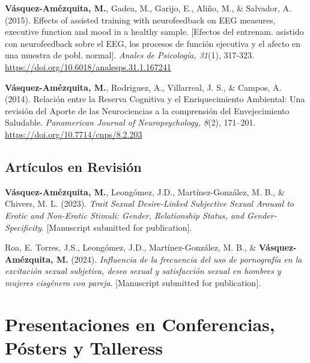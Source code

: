 \documentclass[11pt,a4paper,]{awesome-cv}
\begin{document}
\textbf{Vásquez-Amézquita, M.}, Gadea, M., Garijo, E., Aliño, M., \&
Salvador, A. (2015). Effects of assisted training with neurofeedback on
EEG measures, executive function and mood in a healthy sample.
{[}Efectos del entrenam. asistido con neurofeedback sobre el EEG, los
procesos de función ejecutiva y el afecto en una muestra de pobl.
normal{]}. \emph{Anales de Psicología, 31}(1), 317-323.
\url{https://doi.org/10.6018/analesps.31.1.167241}

\textbf{Vásquez-Amézquita, M.}, Rodriguez, A., Villarreal, J. S., \&
Campos, A. (2014). Relación entre la Reserva Cognitiva y el
Enriquecimiento Ambiental: Una revisión del Aporte de las Neurociencias
a la comprensión del Envejecimiento Saludable. \emph{Panamerican Journal
of Neuropsychology, 8}(2), 171--201.
\url{https://doi.org/10.7714/cnps/8.2.203}

\endgroup

\hypertarget{section-1}{%
\subsection{\texorpdfstring{\textbf{Artículos en Revisión}}{}}\label{section-1}}

\begingroup
\footnotesize
\setlength{\parindent}{-0.5in}
\setlength{\leftskip}{0.5in}

\textbf{Vásquez-Amézquita, M.}, Leongómez, J.D., Martínez-González, M.
B., \& Chivers, M. L. (2023). \emph{Trait Sexual Desire-Linked
Subjective Sexual Arousal to Erotic and Non-Erotic Stimuli: Gender,
Relationship Status, and Gender-Specificity}. {[}Manuscript submitted
for publication{]}.

Roa, E. Torres, J.S., Leongómez, J.D., Martínez-González, M. B., \&
\textbf{Vásquez-Amézquita, M.} (2024). \emph{Influencia de la frecuencia
del uso de pornografía en la excitación sexual subjetiva, deseo sexual y
satisfacción sexual en hombres y mujeres cisgénero con pareja}.
{[}Manuscript submitted for publication{]}.

\endgroup

\hypertarget{presentaciones-en-conferencias-puxf3sters-y-talleress}{%
\section{Presentaciones en Conferencias, Pósters y
Talleress}\label{presentaciones-en-conferencias-puxf3sters-y-talleress}}

\begingroup
\footnotesize
\setlength{\parindent}{-0.5in}
\setlength{\leftskip}{0.5in}
\end{document}
